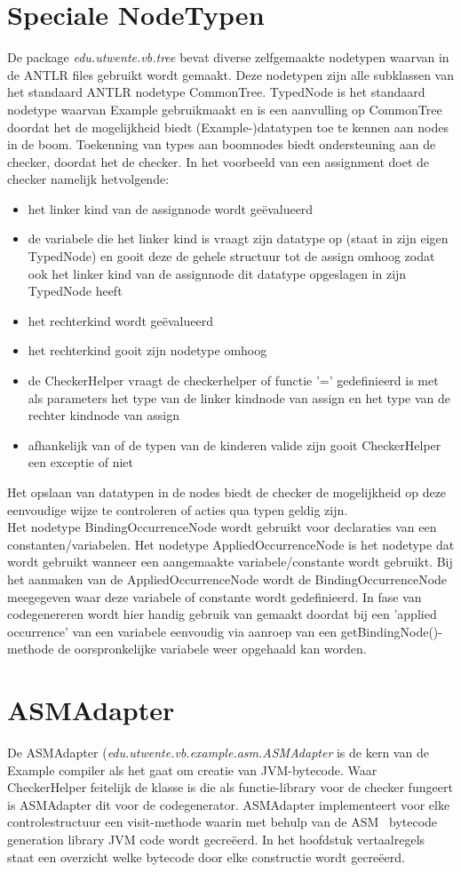 \section{Speciale NodeTypen}
De package \emph{edu.utwente.vb.tree} bevat diverse zelfgemaakte nodetypen waarvan in de ANTLR files gebruikt wordt gemaakt. Deze nodetypen zijn alle subklassen van het standaard ANTLR nodetype CommonTree. TypedNode is het standaard nodetype waarvan Example gebruikmaakt en is een aanvulling op CommonTree doordat het de mogelijkheid biedt (Example-)datatypen toe te kennen aan nodes in de boom. Toekenning van types aan boomnodes biedt ondersteuning aan de checker, doordat het de checker. In het voorbeeld van een assignment doet de checker namelijk hetvolgende: 
\begin{itemize}
\item het linker kind van de assignnode wordt ge\"{e}valueerd
\item de variabele die het linker kind is vraagt zijn datatype op (staat in zijn eigen TypedNode) en gooit deze de gehele structuur tot de assign omhoog zodat ook het linker kind van de assignnode dit datatype opgeslagen in zijn TypedNode heeft
\item het rechterkind wordt ge\"{e}valueerd
\item het rechterkind gooit zijn nodetype omhoog
\item de CheckerHelper vraagt de checkerhelper of functie '=' gedefinieerd is met als parameters het type van de linker kindnode van assign en het type van de  rechter kindnode van assign
\item afhankelijk van of de typen van de kinderen valide zijn gooit CheckerHelper een exceptie of niet
\end{itemize}
Het opslaan van datatypen in de nodes biedt de checker de mogelijkheid op deze eenvoudige wijze te controleren of acties qua typen geldig zijn.\\
Het nodetype BindingOccurrenceNode wordt gebruikt voor declaraties van een constanten/variabelen. Het nodetype AppliedOccurrenceNode is het nodetype dat wordt gebruikt wanneer een aangemaakte variabele/constante wordt gebruikt. Bij het aanmaken van de AppliedOccurrenceNode wordt de BindingOccurrenceNode meegegeven waar deze variabele of constante wordt gedefinieerd. In fase van codegenereren wordt hier handig gebruik van gemaakt doordat bij een 'applied occurrence' van een variabele eenvoudig via aanroep van een getBindingNode()-methode de oorspronkelijke variabele weer opgehaald kan worden.\\

\section{ASMAdapter}
De ASMAdapter (\emph{edu.utwente.vb.example.asm.ASMAdapter} is de kern van de Example compiler als het gaat om creatie van JVM-bytecode. Waar CheckerHelper feitelijk de klasse is die als functie-library voor de checker fungeert is ASMAdapter dit voor de codegenerator. ASMAdapter implementeert voor elke controlestructuur een visit-methode waarin met behulp van de ASM~\cite{ASM} bytecode generation library JVM code wordt gecre\"{e}erd. In het hoofdstuk vertaalregels staat een overzicht welke bytecode door elke constructie wordt gecre\"{e}erd.
